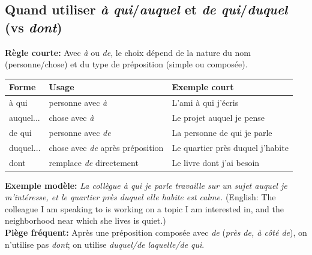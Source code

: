 \documentclass{article}
\begin{document}
\subsection{Quand utiliser \textit{à qui}/\textit{auquel} et \textit{de qui}/\textit{duquel} (vs \textit{dont})}
\textbf{Règle courte:} Avec \textit{à} ou \textit{de}, le choix dépend de la nature du nom (personne/chose) et du type de préposition (simple ou composée).
\begin{center}
    \begin{tabular}{|l|l|l|}
        \hline
        \textbf{Forme} & \textbf{Usage} & \textbf{Exemple court} \\
        \hline
        à qui & personne avec \textit{à} & L'ami à qui j'écris \\
        \hline
        auquel... & chose avec \textit{à} & Le projet auquel je pense \\
        \hline
        de qui & personne avec \textit{de} & La personne de qui je parle \\
        \hline
        duquel... & chose avec \textit{de} après préposition & Le quartier près duquel j'habite \\
        \hline
        dont & remplace \textit{de} directement & Le livre dont j'ai besoin \\
        \hline
    \end{tabular}
\end{center}
\textbf{Exemple modèle:} \textit{La collègue à qui je parle travaille sur un sujet auquel je m'intéresse, et le quartier près duquel elle habite est calme.} (English: The colleague I am speaking to is working on a topic I am interested in, and the neighborhood near which she lives is quiet.) \\
\textbf{Piège fréquent:} Après une préposition composée avec \textit{de} (\textit{près de, à côté de}), on n'utilise pas \textit{dont}; on utilise \textit{duquel/de laquelle/de qui}.
\end{document}

